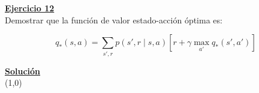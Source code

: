 \indent\underline{\textbf{Ejercicio 12}}\\
Demostrar que la función de valor estado-acción óptima es:

\[
    q_{\ast}(s,a) = \sum_{s',r} p(s',r \mid s,a) \left[ r + \gamma \max_{a'} q_{\ast}(s',a') \right]
\]

\indent\underline{\textbf{Solución}}\\

\line(1,0){\textwidth}
